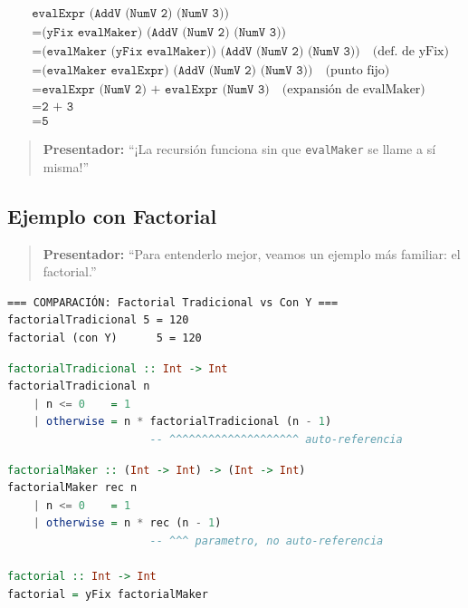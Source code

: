 \documentclass[12pt]{article}
\begin{document}
\begin{align*}
&\texttt{evalExpr (AddV (NumV 2) (NumV 3))} \\
&= \texttt{(yFix evalMaker) (AddV (NumV 2) (NumV 3))} \\
&= \texttt{(evalMaker (yFix evalMaker)) (AddV (NumV 2) (NumV 3))} \quad \text{(def. de yFix)} \\
&= \texttt{(evalMaker evalExpr) (AddV (NumV 2) (NumV 3))} \quad \text{(punto fijo)} \\
&= \texttt{evalExpr (NumV 2) + evalExpr (NumV 3)} \quad \text{(expansión de evalMaker)} \\
&= \texttt{2 + 3} \\
&= \texttt{5}
\end{align*}

\begin{quote}
\textbf{Presentador:} ``¡La recursión funciona sin que \texttt{evalMaker} se llame a sí misma!''
\end{quote}

\newpage
\subsection*{Ejemplo con Factorial}

\begin{quote}
\textbf{Presentador:} ``Para entenderlo mejor, veamos un ejemplo más familiar: el factorial.''
\end{quote}

\begin{verbatim}
=== COMPARACIÓN: Factorial Tradicional vs Con Y ===
factorialTradicional 5 = 120
factorial (con Y)      5 = 120
\end{verbatim}

\begin{lstlisting}[language=Haskell, caption=Factorial Tradicional]
factorialTradicional :: Int -> Int
factorialTradicional n
    | n <= 0    = 1
    | otherwise = n * factorialTradicional (n - 1)
                      -- ^^^^^^^^^^^^^^^^^^^^ auto-referencia
\end{lstlisting}

\begin{lstlisting}[language=Haskell, caption=Factorial con Y]
factorialMaker :: (Int -> Int) -> (Int -> Int)
factorialMaker rec n
    | n <= 0    = 1
    | otherwise = n * rec (n - 1)
                      -- ^^^ parametro, no auto-referencia

factorial :: Int -> Int
factorial = yFix factorialMaker
\end{lstlisting}
\end{document}
